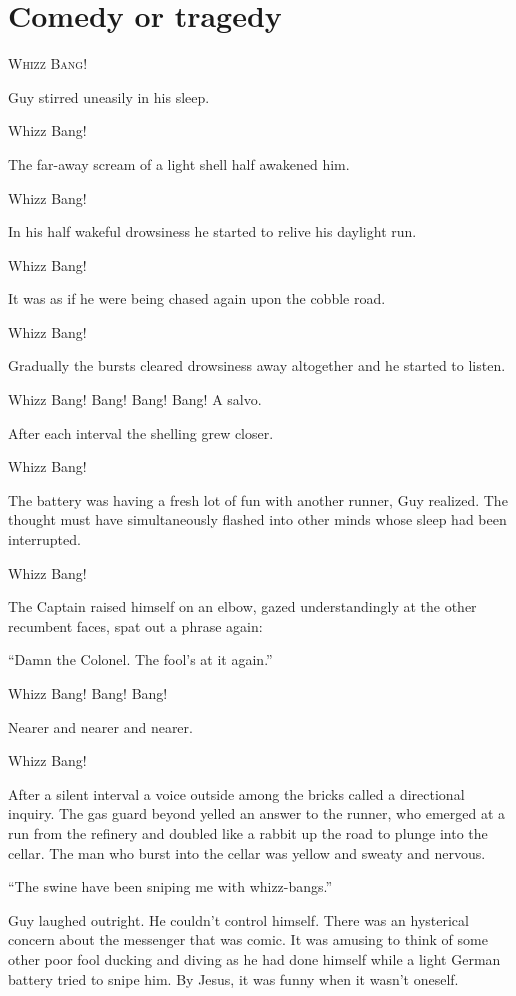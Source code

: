\chapter*{\textsf{Comedy or tragedy}}

W\textsc{hizz} B\textsc{ang}!

Guy stirred uneasily in his sleep.

Whizz Bang!

The far-away scream of a light shell half awakened him.

Whizz Bang!

In his half wakeful drowsiness he started to relive his daylight run.

Whizz Bang!

It was as if he were being chased again upon the cobble road.

Whizz Bang!

Gradually the bursts cleared drowsiness away altogether and he started to listen.

Whizz Bang! Bang! Bang! Bang! A salvo.

After each interval the shelling grew closer.

Whizz Bang!

The battery was having a fresh lot of fun with another runner, Guy realized. The thought must have simultaneously flashed into other minds whose sleep had been interrupted.

Whizz Bang!

The Captain raised himself on an elbow, gazed understandingly at the other recumbent faces, spat out a phrase again:

``Damn the Colonel. The fool's at it again.''

Whizz Bang! Bang! Bang!

Nearer and nearer and nearer.

Whizz Bang!

After a silent interval a voice outside among the bricks called a directional inquiry. The gas guard beyond yelled an answer to the runner, who emerged at a run from the refinery and doubled like a rabbit up the road to plunge into the cellar. The man who burst into the cellar was yellow and sweaty and nervous.

``The swine have been sniping me with whizz-bangs.''

Guy laughed outright. He couldn't control himself. There was an hysterical concern about the messenger that was comic. It was amusing to think of some other poor fool ducking and diving as he had done himself while a light German battery tried to snipe him. By Jesus, it was funny when it wasn't oneself.

